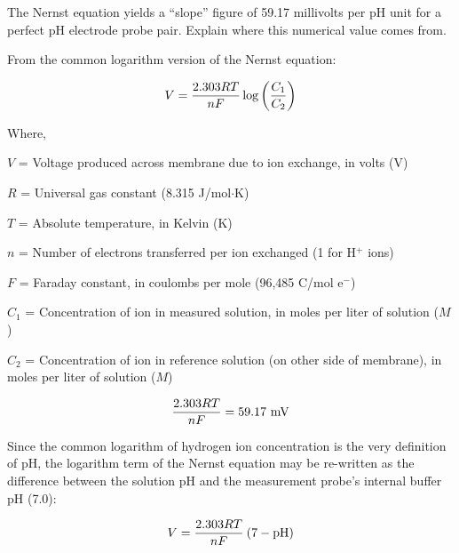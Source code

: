 

The Nernst equation yields a ``slope'' figure of 59.17 millivolts per pH unit for a perfect pH electrode probe pair.  Explain where this numerical value comes from.







From the common logarithm version of the Nernst equation:

$$V = {{2.303 R T} \over {nF}} \log \left({C_1 \over C_2}\right)$$

\noindent
Where,

$V$ = Voltage produced across membrane due to ion exchange, in volts (V)

$R$ = Universal gas constant (8.315 J/mol$\cdot$K)

$T$ = Absolute temperature, in Kelvin (K)

$n$ = Number of electrons transferred per ion exchanged (1 for H$^{+}$ ions)

$F$ = Faraday constant, in coulombs per mole (96,485 C/mol e$^{-}$)

$C_1$ = Concentration of ion in measured solution, in moles per liter of solution ($M$)

$C_2$ = Concentration of ion in reference solution (on other side of membrane), in moles per liter of solution ($M$)

\vskip 10pt

$${{2.303 R T} \over {nF}} = 59.17 \hbox{ mV}$$

\vskip 10pt

Since the common logarithm of hydrogen ion concentration is the very definition of pH, the logarithm term of the Nernst equation may be re-written as the difference between the solution pH and the measurement probe's internal buffer pH (7.0):

$$V = {{2.303 R T} \over {nF}} \> (7 - \hbox{pH})$$











